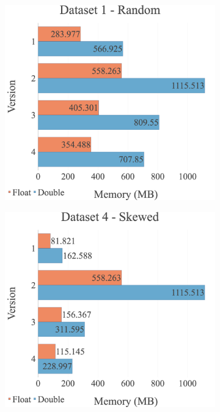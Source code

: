 \begin{figure}[H]
\centering
\begin{subfigure}{.49\textwidth}
  \centering
  \includegraphics[width=1\linewidth]{img/experiments/mem-option-versions-1_RAND.png}
\end{subfigure}
\begin{subfigure}{.49\textwidth}
  \centering
  \includegraphics[width=1\linewidth]{img/experiments/mem-option-versions-4_SKEWED.png}

\end{subfigure}
\end{figure}
